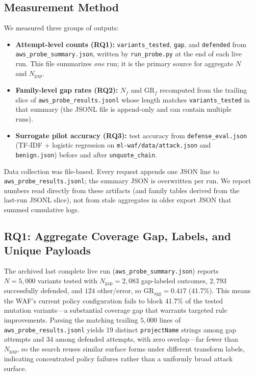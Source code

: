 \subsection{Measurement Method}
We measured three groups of outputs:
\begin{itemize}
  \item \textbf{Attempt-level counts (RQ1):} \texttt{variants\_tested}, \texttt{gap}, and \texttt{defended} from \texttt{aws\_probe\_summary.json}, written by \texttt{run\_probe.py} at the end of each live run. This file summarizes \emph{one} run; it is the primary source for aggregate $N$ and $N_{\mathrm{gap}}$.
  \item \textbf{Family-level gap rates (RQ2):} $N_f$ and $\mathrm{GR}_f$ recomputed from the trailing slice of \texttt{aws\_probe\_results.jsonl} whose length matches \texttt{variants\_tested} in that summary (the JSONL file is append-only and can contain multiple runs).
  \item \textbf{Surrogate pilot accuracy (RQ3):} test accuracy from \texttt{defense\_eval.json} (TF-IDF + logistic regression on \texttt{ml-waf/data/attack.json} and \texttt{benign.json}) before and after \texttt{unquote\_chain}.
\end{itemize}
Data collection was file-based. Every request appends one JSON line to \texttt{aws\_probe\_results.jsonl}; the summary JSON is overwritten per run. We report numbers read directly from these artifacts (and family tables derived from the last-run JSONL slice), not from stale aggregates in older export JSON that summed cumulative logs.

\subsection{RQ1: Aggregate Coverage Gap, Labels, and Unique Payloads}
The archived last complete live run (\texttt{aws\_probe\_summary.json}) reports $N=5{,}000$ variants tested with $N_{\mathrm{gap}}=2{,}083$ gap-labeled outcomes, $2{,}793$ successfully defended, and $124$ \textsf{other}/error, so $\mathrm{GR}_{\mathrm{agg}}=0.417$ (41.7\%). This means the WAF's current policy configuration fails to block 41.7\% of the tested mutation variants---a substantial coverage gap that warrants targeted rule improvements. Parsing the matching trailing $5{,}000$ lines of \texttt{aws\_probe\_results.jsonl} yields 19 distinct \texttt{projectName} strings among gap attempts and 34 among defended attempts, with zero overlap---far fewer than $N_{\mathrm{gap}}$, so the search reuses similar surface forms under different transform labels, indicating concentrated policy failures rather than a uniformly broad attack surface.


